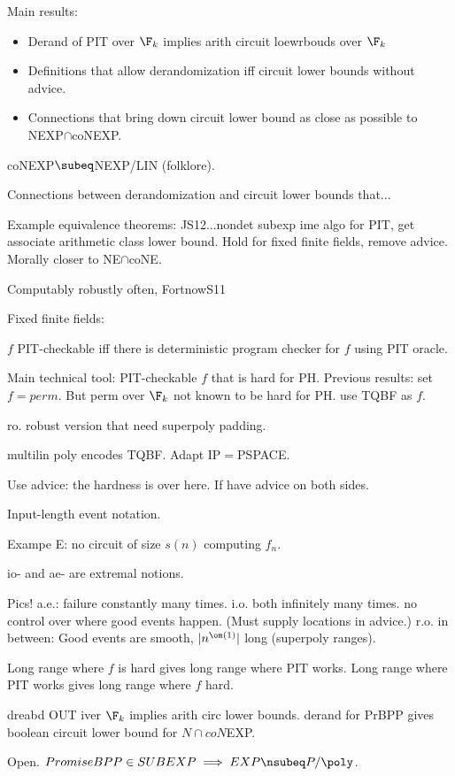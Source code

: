 
Main results:
\begin{itemize}
\item
Derand of PIT over $\F_k$ implies arith circuit loewrbouds over $\F_k$
\item
Definitions that allow derandomization iff circuit lower bounds without advice.
\item
Connections that bring down circuit lower bound as close as possible to NEXP$\cap$coNEXP.
\end{itemize}
coNEXP$\subeq$NEXP/LIN (folklore).

Connections between derandomization and circuit lower bounds that...

Example equivalence theorems: JS12...nondet subexp ime algo for PIT, get associate arithmetic class lower bound. Hold for fixed finite fields, remove advice. Morally closer to NE$\cap $coNE. 

Computably robustly often, FortnowS11

Fixed finite fields: 

$f$ PIT-checkable iff there is deterministic program checker for $f$ using PIT oracle.

Main technical tool: PIT-checkable $f$ that is hard for PH. Previous results: set $f=perm$. But perm over $\F_k$ not known to be hard for PH. use TQBF as $f$. 

ro. robust version that need superpoly padding.

multilin poly encodes TQBF. Adapt IP$=$PSPACE.

Use advice: the hardness is over here. If have advice on both sides.

Input-length event notation.

Exampe E: no circuit of size $s(n)$ computing $f_n$.

io- and ae- are extremal notions. 

Pics! a.e.: failure constantly many times. i.o. both infinitely many times. no control over where good events happen. (Must supply locations in advice.) r.o. in between: Good events are smooth, $|n^{\om(1)}|$ long (superpoly ranges). 

Long range where $f$ is hard gives long range where PIT works. Long range where PIT works gives long range where $f$ hard. 

dreabd OUT iver $\F_k$ implies arith circ lower bounds. derand for PrBPP gives boolean circuit lower bound for $N\cap coN$EXP.

Open. $PromiseBPP\in SUBEXP\implies EXP\nsubeq P/\poly$.

\printbibliography
